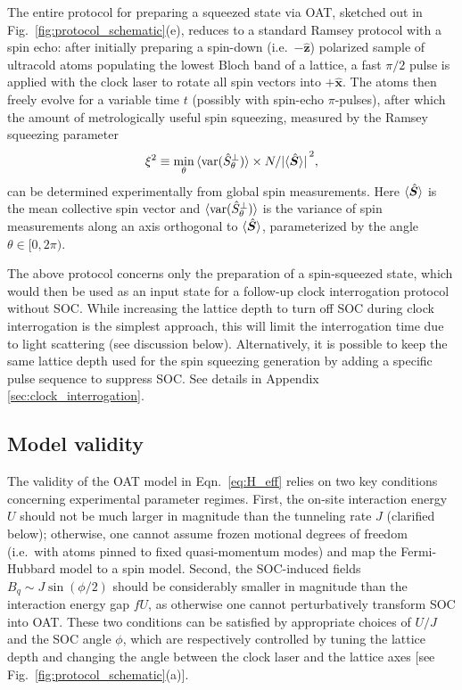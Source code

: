 \documentclass[aps,prx,superscriptaddress,notitlepage,twocolumn,longbibliography]{revtex4-2}
\renewcommand{\t}{\text} %
\renewcommand{\v}{\bm} %
\newcommand{\uv}[1]{\hat{\bm #1}} %
\begin{document}
The entire protocol for preparing a squeezed state via OAT, sketched out in Fig.~\ref{fig:protocol_schematic}(e), reduces to a standard Ramsey protocol with a spin echo: after initially preparing a spin-down (i.e.~$-\uv z$) polarized sample of ultracold atoms populating the lowest Bloch band of a lattice, a fast $\pi/2$ pulse is applied with the clock laser to rotate all spin vectors into $+\uv x$.
The atoms then freely evolve for a variable time $t$ (possibly with spin-echo $\pi$-pulses), after which the amount of metrologically useful spin squeezing, measured by the Ramsey squeezing parameter
\begin{align}
  \xi^2 \equiv
  \min_\theta \braket{\t{var}(\hat S^\perp_\theta)}
  \times N/\abs*{\braket{\hat{\v S}}}^2,
\end{align}
can be determined experimentally from global spin measurements.
Here $\braket{\hat{\v S}}$ is the mean collective spin vector and $\braket{\t{var}(\hat S^\perp_\theta)}$ is the variance of spin measurements along an axis orthogonal to $\braket{\hat{\v S}}$, parameterized by the angle $\theta\in[0,2\pi)$.

The above protocol concerns only the preparation of a spin-squeezed state, which would then be used as an input state for a follow-up clock interrogation protocol without SOC.
While increasing the lattice depth to turn off SOC during clock interrogation is the simplest approach, this will limit the interrogation time due to light scattering (see discussion below).
Alternatively, it is possible to keep the same lattice depth used for the spin squeezing generation by adding a specific pulse sequence to suppress SOC.
See details in Appendix \ref{sec:clock_interrogation}.

\subsection{Model validity}
\label{sec:validity}

The validity of the OAT model in Eqn.~\eqref{eq:H_eff} relies on two key conditions concerning experimental parameter regimes.
First, the on-site interaction energy $U$ should not be much larger in magnitude than the tunneling rate $J$ (clarified below); otherwise, one cannot assume frozen motional degrees of freedom (i.e.~with atoms pinned to fixed quasi-momentum modes) and map the Fermi-Hubbard model to a spin model.
Second, the SOC-induced fields $B_q\sim J\sin(\phi/2)$ should be considerably smaller in magnitude than the interaction energy gap $fU$, as otherwise one cannot perturbatively transform SOC into OAT.
These two conditions can be satisfied by appropriate choices of $U/J$ and the SOC angle $\phi$, which are respectively controlled by tuning the lattice depth and changing the angle between the clock laser and the lattice axes [see Fig.~\ref{fig:protocol_schematic}(a)].
\end{document}
